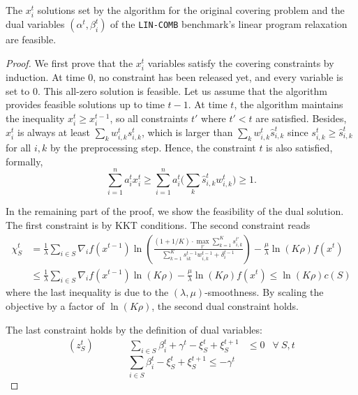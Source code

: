 \begin{lemma} \label{lem:covering-feasibility}
The $x_{i}^{t}$ solutions set by the algorithm for the original covering problem and the dual variables $(\alpha^{t}, \beta_{i}^{t})$ of the \texttt{LIN-COMB} benchmark's linear program relaxation are feasible.
\end{lemma}
%
\begin{proof}
We first prove that the $x_{i}^{t}$ variables satisfy the covering constraints by induction. At time 0, no constraint has been released yet, and every variable is set to 0. This all-zero solution is feasible. Let us assume that the algorithm provides feasible solutions up to time $t-1$. At time $t$, the algorithm maintains the inequality $x_{i}^{t} \geq x_{i}^{t-1}$, so all constraints $t'$ where $t' < t$ are satisfied. Besides, $x_{i}^{t}$ is always at least
$\sum_{k} w_{i,k}^{t} s_{i,k}^{t}$, which is larger than $\sum_{k} w_{i,k}^{t} \hat{s}_{i,k}^{t}$ since $s_{i,k}^{t} \geq \hat{s}_{i,k}^{t}$
for all $i,k$ by the preprocessing step. Hence, the constraint $t$ is also satisfied, formally,
$$
\sum_{i=1}^{n} a_{i}^{t} x_{i}^{t}  \geq \sum_{i=1}^{n} a_{i}^{t} \biggl( \sum_{k} \hat{s}_{i,k}^{t} w_{i,k}^{t} \biggr) \geq 1.
$$

In the remaining part of the proof, we show the feasibility of the dual solution.
The first constraint is by KKT conditions.
The second constraint reads
%
\begin{align*}
\chi_{S}^{t} &= \frac{1}{\lambda} \sum_{i \in S} \nabla_{i} f(x^{t-1}) \ln \left( \frac{(1 + 1/K) \cdot \max_{t'} \sum_{k=1}^{K} s_{i,k}^{t'}}{\sum_{k=1}^{K}  s_{ik}^{t-1}w_{i,k}^{t-1}  + \delta_{i}^{t-1}} \right) - \frac{\mu}{\lambda} \ln(K\rho) f(x^{t})  \\
&\leq \frac{1}{\lambda} \sum_{i \in S} \nabla_{i} f(x^{t-1}) \ln(K\rho)  - \frac{\mu}{\lambda} \ln(K\rho) f(x^{t})
\leq  \ln(K\rho) c(S)
\end{align*}
%
where the last inequality is due to the $(\lambda,\mu)$-smoothness. By scaling the objective by a factor of $\ln (K\rho)$, the second dual constraint holds.

The last constraint holds by the definition of dual variables:
\begin{align*}
  (z_{S}^{t}) \qquad && \sum_{i \in S}\beta_{i}^{t} + \gamma^{t} - \xi_{S}^{t} + \xi_{S}^{t+1}  &\leq 0  &\forall\ S,t
\end{align*}
\[\sum_{i \in S}\beta_{i}^{t} - \xi_{S}^{t} + \xi_{S}^{t+1}  \leq -\gamma^{t}\]


\end{proof}
